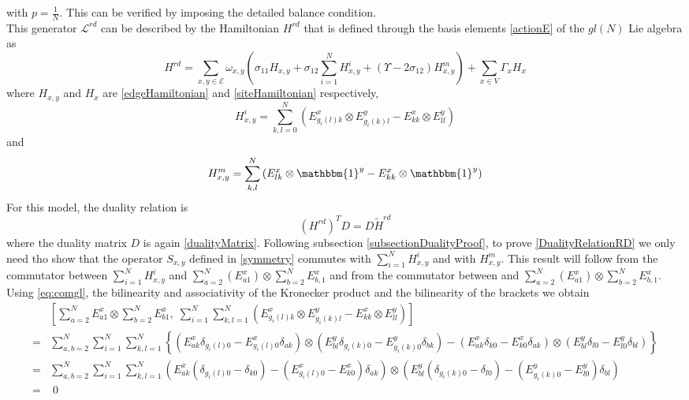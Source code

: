 \documentclass[11pt]{article}
\numberwithin{equation}{section}
\numberwithin{equation}{subsection}
\begin{document}
with $p=\frac{1}{N}$. This can be verified by imposing the detailed balance condition.\\
This generator $\mathcal{L}^{rd}$ can be described by the Hamiltonian $H^{rd}$ that is defined through the basis elements \eqref{actionE} of the $gl(N)$ Lie algebra as 
\begin{equation}
    H^{rd}=\sum_{x,y\in \mathcal{E}}\omega_{x,y}\left(\sigma_{11}H_{x,y}+\sigma_{12}\sum_{i=1}^{N}H_{x,y}^{i}+(\Upsilon-2\sigma_{12})H_{x,y}^{m}\right)+\sum_{x\in V}\Gamma_{x}H_{x}
\end{equation}
where $H_{x,y}$ and $H_{x}$ are \eqref{edgeHamiltonian} and \eqref{siteHamiltonian} respectively, 
\begin{equation}
    H_{x,y}^{i}=\sum_{k,l=0}^{N}\left(E_{g_{i}(l)k}^{x}\otimes E_{g_{i}(k)l}^{y}-E_{kk}^{x}\otimes E_{ll}^{y}\right)
\end{equation}
and 
\begin{equation}
    H_{x,y}^{m}=\sum_{k,l}^{N}\left(E_{lk}^{x}\otimes \mathbbm{1}^{y}-E_{kk}^{x}\otimes \mathbbm{1}^{y}\right)
\end{equation}
For this model, the duality relation is
\begin{equation}\label{DualityRelationRD}
    (H^{rd})^{T}D=D\widetilde{H}^{rd}
\end{equation}
where the duality matrix $D$ is again \eqref{dualityMatrix}. Following subsection \ref{subsectionDualityProof}, to prove \eqref{DualityRelationRD} we only need tho show that the operator $S_{x,y}$ defined in \eqref{symmetry} commutes with $\sum_{i=1}^{N}H_{x,y}^{i}$ and with $H_{x,y}^{m}$. This result will follow from the commutator between $\sum_{i=1}^{N}H_{x,y}^{i}$ and $\sum_{a=2}^{N}(E_{a1}^{x})\otimes \sum_{b=2}^{N}E_{b,1}^{x}$ and from the commutator between  and $\sum_{a=2}^{N}(E_{a1}^{x})\otimes \sum_{b=2}^{N}E_{b,1}^{x}$. Using \eqref{eq:comgl}, the bilinearity and associativity of the Kronecker product and the bilinearity of the brackets we obtain 
\begin{align*}
    &\left[\sum_{a=2}^{N}E_{a1}^{x}\otimes \sum_{b=2}^{N}E_{b1}^{x},\;\sum_{i=1}^{N}\sum_{k,l=1}^{N}\left(E_{g_{i}(l)k}^{x}\otimes E_{g_{i}(k)l}^{y}-E_{kk}^{x}\otimes E_{ll}^{y}\right)\right]
    \\=&\sum_{a,b=2}^{N}\sum_{i=1}^{N}\sum_{k,l=1}^{N}\left\{\left(E_{ak}^{x}\delta_{g_{i}(l)0}-E_{g_{i}(l)0}^{x}\delta_{ak}\right)\otimes \left(E_{bl}^{y}\delta_{g_{i}(k)0}-E_{g_{i}(k)0}^{y}\delta_{bk}\right)-\left(E_{ak}^{x}\delta_{k0}-E_{k0}^{x}\delta_{ak}\right)\otimes \left(E_{bl}^{y}\delta_{l0}-E_{l0}^{y}\delta_{bl}\right)\right\}
    \\=&
    \sum_{a,b=2}^{N}\sum_{i=1}^{N}\sum_{k,l=1}^{N}\left(E_{ak}^{x}\left(\delta_{g_{i}(l)0}-\delta_{k0}\right)-\left(E_{g_{i}(l)0}^{x}-E_{k0}^{x}\right)\delta_{ak}\right)\otimes \left(E_{bl}^{y}\left(\delta_{g_{i}(k)0}-\delta_{l0}\right)-\left(E_{g_{i}(k)0}^{y}-E_{l0}^{y}\right)\delta_{bl}\right)
    \\=&\;0
\end{align*}
\end{document}
